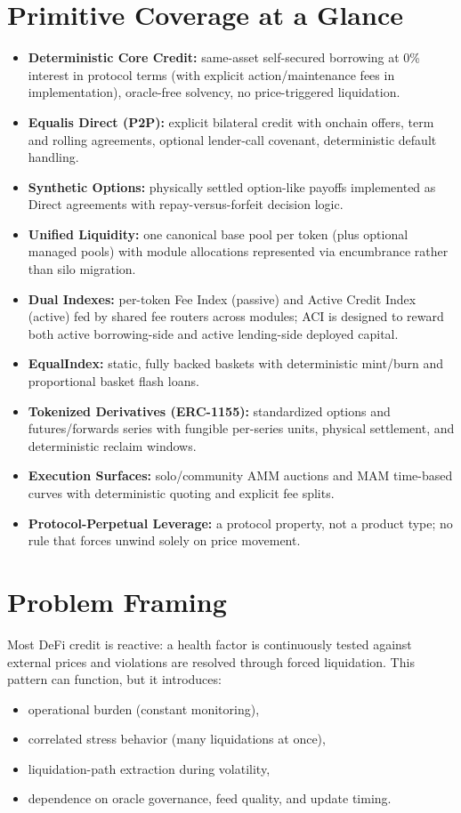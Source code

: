 \documentclass[version=preprint]{iacrcc}
\begin{document}
\section*{Primitive Coverage at a Glance}
\begin{itemize}
  \item \textbf{Deterministic Core Credit:} same-asset self-secured borrowing at 0\% interest in protocol terms (with explicit action/maintenance fees in implementation), oracle-free solvency, no price-triggered liquidation.
  \item \textbf{Equalis Direct (P2P):} explicit bilateral credit with onchain offers, term and rolling agreements, optional lender-call covenant, deterministic default handling.
  \item \textbf{Synthetic Options:} physically settled option-like payoffs implemented as Direct agreements with repay-versus-forfeit decision logic.
  \item \textbf{Unified Liquidity:} one canonical base pool per token (plus optional managed pools) with module allocations represented via encumbrance rather than silo migration.
  \item \textbf{Dual Indexes:} per-token Fee Index (passive) and Active Credit Index (active) fed by shared fee routers across modules; ACI is designed to reward both active borrowing-side and active lending-side deployed capital.
  \item \textbf{EqualIndex:} static, fully backed baskets with deterministic mint/burn and proportional basket flash loans.
  \item \textbf{Tokenized Derivatives (ERC-1155):} standardized options and futures/forwards series with fungible per-series units, physical settlement, and deterministic reclaim windows.
  \item \textbf{Execution Surfaces:} solo/community AMM auctions and MAM time-based curves with deterministic quoting and explicit fee splits.
  \item \textbf{Protocol-Perpetual Leverage:} a protocol property, not a product type; no rule that forces unwind solely on price movement.
\end{itemize}

\section{Problem Framing}

Most DeFi credit is reactive: a health factor is continuously tested against external prices and violations are resolved through forced liquidation. This pattern can function, but it introduces:
\begin{itemize}
  \item operational burden (constant monitoring),
  \item correlated stress behavior (many liquidations at once),
  \item liquidation-path extraction during volatility,
  \item dependence on oracle governance, feed quality, and update timing.
\end{itemize}
\end{document}
